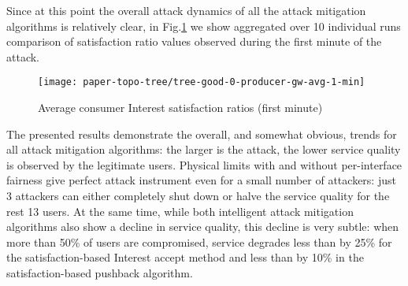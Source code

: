 Since at this point the overall attack dynamics of all the attack mitigation algorithms is relatively clear, in Fig.\ref{fig:small-scale-topo boxplot} we show aggregated over 10 individual runs comparison of satisfaction ratio values observed during the first minute of the attack.

\begin{figure}[htbp]
  \centering
  \texttt{[image: paper-topo-tree/tree-good-0-producer-gw-avg-1-min]}
  \caption{Average consumer Interest satisfaction ratios (first minute)}
  \label{fig:small-scale-topo boxplot}
\end{figure}

The presented results demonstrate the overall, and somewhat obvious, trends for all attack mitigation algorithms: the larger is the attack, the lower service quality is observed by the legitimate users.
Physical limits with and without per-interface fairness give perfect attack instrument even for a small number of attackers: just 3 attackers can either completely shut down or halve the service quality for the rest 13 users.
At the same time, while both intelligent attack mitigation algorithms also show a decline in service quality, this decline is very subtle: when more than 50\% of users are compromised, service degrades less than by 25\% for the satisfaction-based Interest accept method and less than by 10\% in the satisfaction-based pushback algorithm.




